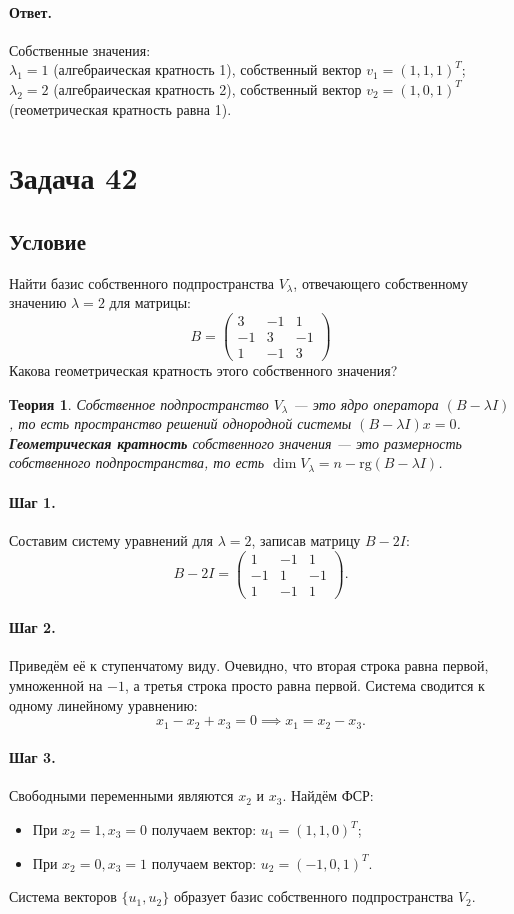 \documentclass[12pt,a4paper]{article}
\theoremstyle{solution}
\newtheorem*{theory}{Теория}
\newcommand{\task}[1]{\newpage\section*{Задача #1}}
\newcommand{\answer}{\paragraph{Ответ.}}
\newcommand{\step}[1]{\paragraph{Шаг #1.}}
\begin{document}
\answer
Собственные значения: \\
$\lambda_1 = 1$ (алгебраическая кратность 1), собственный вектор $v_1 = (1, 1, 1)^T$; \\
$\lambda_2 = 2$ (алгебраическая кратность 2), собственный вектор $v_2 = (1, 0, 1)^T$ (геометрическая кратность равна 1).

\task{42}
\subsection*{Условие}
Найти базис собственного подпространства $V_\lambda$, отвечающего собственному значению $\lambda = 2$ для матрицы:
\[
B = \begin{pmatrix} 3 & -1 & 1 \\ -1 & 3 & -1 \\ 1 & -1 & 3 \end{pmatrix}
\]
Какова геометрическая кратность этого собственного значения?

\begin{theory}
Собственное подпространство $V_\lambda$ — это ядро оператора $(B - \lambda I)$, то есть пространство решений однородной системы $(B - \lambda I)x = 0$. \textbf{Геометрическая кратность} собственного значения — это размерность собственного подпространства, то есть $\dim V_\lambda = n - \mathrm{rg}(B - \lambda I)$.
\end{theory}

\step{1} Составим систему уравнений для $\lambda = 2$, записав матрицу $B - 2I$:
\[
B - 2I = \begin{pmatrix} 1 & -1 & 1 \\ -1 & 1 & -1 \\ 1 & -1 & 1 \end{pmatrix}.
\]

\step{2} Приведём её к ступенчатому виду. Очевидно, что вторая строка равна первой, умноженной на $-1$, а третья строка просто равна первой. Система сводится к одному линейному уравнению:
\[
x_1 - x_2 + x_3 = 0 \implies x_1 = x_2 - x_3.
\]

\step{3} Свободными переменными являются $x_2$ и $x_3$. Найдём ФСР:
\begin{itemize}
    \item При $x_2 = 1, x_3 = 0$ получаем вектор: $u_1 = (1, 1, 0)^T$;
    \item При $x_2 = 0, x_3 = 1$ получаем вектор: $u_2 = (-1, 0, 1)^T$.
\end{itemize}
Система векторов $\{u_1, u_2\}$ образует базис собственного подпространства $V_2$.
\end{document}
